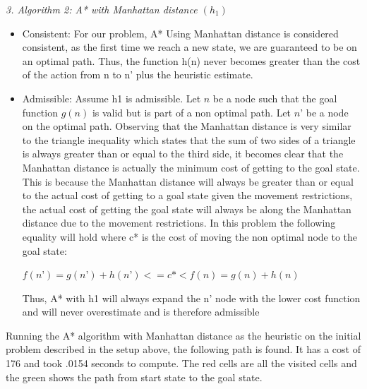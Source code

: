 \documentclass[a4paper]{article}
\begin{document}
\newpage

\textit{3. Algorithm 2: A* with Manhattan distance $(h_1)$}
\begin{itemize}
    \item Consistent: For our problem, A* Using Manhattan distance is considered consistent, as the first time we reach a new state, we are guaranteed to be on an optimal path. Thus, the function h(n) never becomes greater than the cost of the action from n to n’ plus the heuristic estimate.
    \item Admissible: Assume h1 is admissible. Let $n$ be a node such that the goal function $g(n)$ is valid but is part of a non optimal path. Let $n’$ be a node on the optimal path. Observing that the Manhattan distance is very similar to the triangle inequality which states that the sum of two sides of a triangle is always greater than or equal to the third side, it becomes clear that the Manhattan distance is actually the minimum cost of getting to the goal state. This is because the Manhattan distance will always be greater than or equal to the actual cost of getting to a goal state given the movement restrictions, the actual cost of getting the goal state will always be along the Manhattan distance due to the movement restrictions. In this problem the following equality will hold where c* is the cost of moving the non optimal node to the goal state:

$f(n’) = g(n’) + h(n’) <= c* < f(n) = g(n) + h(n)$

Thus, A* with h1 will always expand the n’ node with the lower cost function and will never overestimate and is therefore admissible

\end{itemize}
Running the A* algorithm with Manhattan distance as the heuristic on the initial problem described in the setup above, the following path is found. It has a cost of 176 and took .0154 seconds to compute. The red cells are all the visited cells and the green shows the path from start state to the goal state.
\end{document}
